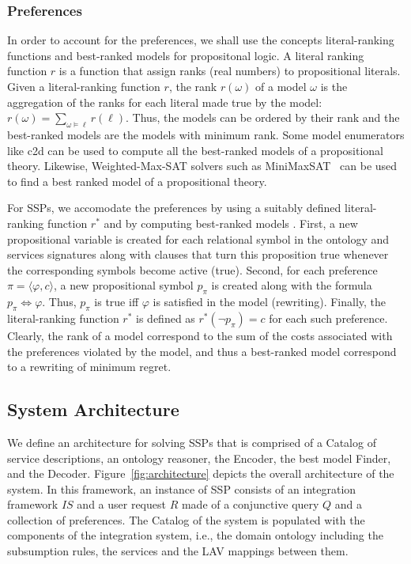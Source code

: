 \documentclass{llncs}
\newcommand{\tup}[1]{\langle #1 \rangle}
\begin{document}
\subsubsection{Preferences}

In order to account for the preferences, we shall use the
concepts literal-ranking functions and best-ranked models for
propositonal logic. A literal ranking function $r$ is a function
that assign ranks (real numbers) to propositional literals.
Given a literal-ranking function $r$, the rank $r(\omega)$ of
a model $\omega$ is the aggregation of the ranks for each literal
made true by the model: $r(\omega)=\sum_{\omega\vDash\ell} r(\ell)$.
Thus, the models can be ordered by their rank and the best-ranked
models are the models with minimum rank.
Some model enumerators like c2d can be used to compute all the
best-ranked models of a propositional theory.
Likewise, Weighted-Max-SAT solvers such as MiniMaxSAT~\cite{HerasetalJAIR2008}
can be used to find a best ranked model of a propositional theory.

For SSPs, we accomodate the preferences by using a suitably defined
literal-ranking function $r^*$ and by computing best-ranked models
\cite{darwiche:weighted}.
First, a new propositional variable is created for each relational
symbol in the ontology and services signatures along with clauses
that turn this proposition true whenever the corresponding symbols
become active (true). Second, for each preference $\pi=\tup{\varphi,c}$,
a new propositional symbol $p_\pi$ is created along with the
formula $p_\pi \Leftrightarrow \varphi$. Thus, $p_\pi$ is true
iff $\varphi$ is satisfied in the model (rewriting).
Finally, the literal-ranking function $r^*$ is defined as 
$r^*(\neg p_\pi)=c$ for each such preference.
Clearly, the rank of a model correspond to the sum of the costs
associated with the preferences violated by the model, and thus
a best-ranked model correspond to a rewriting of minimum regret.

\subsection{System Architecture}

We define an architecture for solving SSPs that is comprised of a Catalog of
service descriptions, an ontology reasoner, the Encoder, the best model Finder,
and the Decoder.
Figure~\ref{fig:architecture} depicts the overall architecture of the system.
In this framework, an instance of SSP consists of an integration framework $IS$
and a user request $R$ made of a conjunctive query $Q$ and a collection of
preferences.
The Catalog of the system is populated with the components of the integration system,
i.e., the domain ontology including the subsumption rules, the services and the LAV
mappings between them. 
\end{document}
